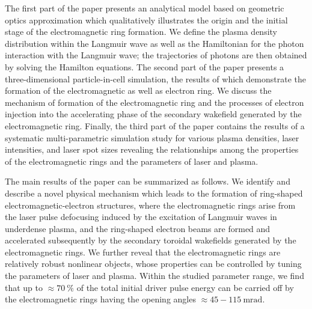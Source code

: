 \documentclass[10pt, a4paper, twoside, openright]{report}
\begin{document}
The first part of the paper presents an analytical model based on geometric optics approximation which qualitatively illustrates the origin and the initial stage of the electromagnetic ring formation. We define the plasma density distribution within the Langmuir wave as well as the Hamiltonian for the photon interaction with the Langmuir wave; the trajectories of photons are then obtained by solving the Hamilton equations. The second part of the paper presents a three-dimensional particle-in-cell simulation, the results of which demonstrate the formation of the electromagnetic as well as electron ring. We discuss the mechanism of formation of the electromagnetic ring and the processes of electron injection into the accelerating phase of the secondary wakefield generated by the electromagnetic ring. Finally, the third part of the paper contains the results of a systematic multi-parametric simulation study for various plasma densities, laser intensities, and laser spot sizes revealing the relationships among the properties of the electromagnetic rings and the parameters of laser and plasma.

The main results of the paper can be summarized as follows. We identify and describe a novel physical mechanism which leads to the formation of ring-shaped electromagnetic-electron structures, where the electromagnetic rings arise from the laser pulse defocusing induced by the excitation of Langmuir waves in underdense plasma, and the ring-shaped electron beams are formed and accelerated subsequently by the secondary toroidal wakefields generated by the electromagnetic rings. We further reveal that the electromagnetic rings are relatively robust nonlinear objects, whose properties can be controlled by tuning the parameters of laser and plasma. Within the studied parameter range, we find that up to $ \approx 70 \ \% $ of the total initial driver pulse energy can be carried off by the electromagnetic rings having the opening angles $ \approx 45 - 115 \ \mathrm{mrad} $. 
\end{document}
